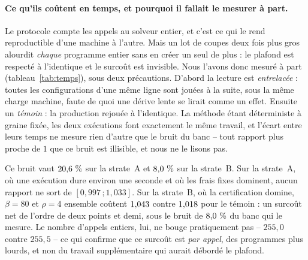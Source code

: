 \documentclass[11pt,a4paper]{article}
\theoremstyle{plain}
\theoremstyle{remark}
\begin{document}
\paragraph{Ce qu'ils coûtent en temps, et pourquoi il fallait le mesurer à
part.} Le protocole compte les appels au solveur entier, et c'est ce qui le
rend reproductible d'une machine à l'autre. Mais un lot de coupes deux fois
plus gros alourdit \emph{chaque} programme entier sans en créer un seul de
plus : le plafond est respecté à l'identique et le surcoût est invisible.
Nous l'avons donc mesuré à part (tableau~\ref{tab:temps}), sous deux
précautions. D'abord la lecture est \emph{entrelacée} : toutes les
configurations d'une même ligne sont jouées à la suite, sous la même charge
machine, faute de quoi une dérive lente se lirait comme un effet. Ensuite un
\emph{témoin} : la production rejouée à l'identique. La méthode étant
déterministe à graine fixée, les deux exécutions font exactement le même
travail, et l'écart entre leurs temps ne mesure rien d'autre que le bruit du
banc -- tout rapport plus proche de $1$ que ce bruit est illisible, et nous
ne le lisons pas.

Ce bruit vaut $20{,}6\ \%$ sur la strate~A et $8{,}0\ \%$ sur
la strate~B. Sur la strate~A, où une exécution dure environ une seconde et
où les frais fixes dominent, aucun rapport ne sort de
$[0{,}997\,;1{,}033]$. Sur la strate~B, où la certification domine, $\beta=80$
et $\rho=4$ ensemble coûtent $1{,}043$ contre $1{,}018$ pour le
témoin : un surcoût net de l'ordre de deux points et demi, sous le bruit de
$8{,}0\ \%$ du banc qui le mesure. Le nombre d'appels entiers, lui, ne
bouge pratiquement pas -- $255{,}0$ contre $255{,}5$ -- ce qui confirme que
ce surcoût est \emph{par appel}, des programmes plus lourds, et non du
travail supplémentaire qui aurait débordé le plafond.
\end{document}
